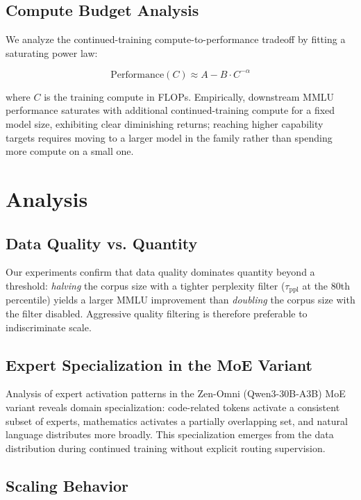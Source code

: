\documentclass[11pt,a4paper]{article}
\begin{document}
\subsection{Compute Budget Analysis}

We analyze the continued-training compute-to-performance tradeoff by fitting a saturating
power law:

\begin{equation}
\text{Performance}(C) \approx A - B \cdot C^{-\alpha}
\end{equation}

where $C$ is the training compute in FLOPs. Empirically, downstream MMLU performance
saturates with additional continued-training compute for a fixed model size, exhibiting
clear diminishing returns; reaching higher capability targets requires moving to a larger
model in the family rather than spending more compute on a small one.

\section{Analysis}

\subsection{Data Quality vs. Quantity}

Our experiments confirm that data quality dominates quantity beyond a threshold:
\emph{halving} the corpus size with a tighter perplexity filter
($\tau_\text{ppl}$ at the 80th percentile) yields a larger MMLU improvement than
\emph{doubling} the corpus size with the filter disabled. Aggressive quality filtering
is therefore preferable to indiscriminate scale.

\subsection{Expert Specialization in the MoE Variant}

Analysis of expert activation patterns in the Zen-Omni (Qwen3-30B-A3B) MoE variant
reveals domain specialization: code-related tokens activate a consistent subset of
experts, mathematics activates a partially overlapping set, and natural language
distributes more broadly. This specialization emerges from the data distribution during
continued training without explicit routing supervision.

\subsection{Scaling Behavior}
\end{document}
